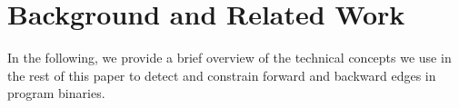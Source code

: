 \section{Background and Related Work}
\label{C++ Bad Forward Indirect Calls}

In the following, we provide a brief overview of the technical
concepts we use in the rest of this paper to detect and constrain forward and backward edges in program binaries.


